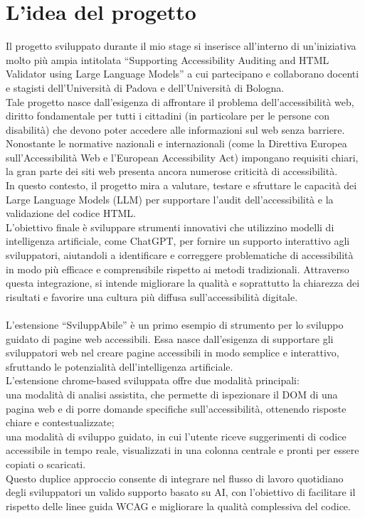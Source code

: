 \section{L'idea del progetto}
Il progetto sviluppato durante il mio stage si inserisce all’interno di un’iniziativa molto più ampia intitolata “Supporting Accessibility Auditing and HTML Validator using Large Language Models” a cui partecipano e collaborano docenti e stagisti dell’Università di Padova e dell’Università di Bologna.\\
Tale progetto nasce dall’esigenza di affrontare il problema dell’accessibilità web, diritto fondamentale per tutti i cittadini (in particolare per le persone con disabilità) che devono poter accedere alle informazioni sul web senza barriere.\\
Nonostante le normative nazionali e internazionali (come la Direttiva Europea sull’Accessibilità Web e l’European Accessibility Act) impongano requisiti chiari, la gran parte dei siti web presenta ancora numerose criticità di accessibilità.\\
In questo contesto, il progetto mira a valutare, testare e sfruttare le capacità dei Large Language Models (LLM) per supportare l’audit dell’accessibilità e la validazione del codice HTML.\\
L’obiettivo finale è sviluppare strumenti innovativi che utilizzino modelli di intelligenza artificiale, come ChatGPT, per fornire un supporto interattivo agli sviluppatori, aiutandoli a identificare e correggere problematiche di accessibilità in modo più efficace e comprensibile rispetto ai metodi tradizionali. Attraverso questa integrazione, si intende migliorare la qualità e soprattutto la chiarezza dei risultati e favorire una cultura più diffusa sull’accessibilità digitale.\\
\\
L’estensione “SviluppAbile” è un primo esempio di strumento per lo sviluppo guidato di pagine web accessibili.
Essa nasce dall’esigenza di supportare gli sviluppatori web nel creare pagine accessibili in modo semplice e interattivo, sfruttando le potenzialità dell’intelligenza artificiale.\\
L’estensione chrome-based sviluppata offre due modalità principali:\\
una modalità di analisi assistita, che permette di ispezionare il DOM di una pagina web e di porre domande specifiche sull’accessibilità, ottenendo risposte chiare e contestualizzate; \\
una modalità di sviluppo guidato, in cui l’utente riceve suggerimenti di codice accessibile in tempo reale, visualizzati in una colonna centrale e pronti per essere copiati o scaricati. \\
Questo duplice approccio consente di integrare nel flusso di lavoro quotidiano degli sviluppatori un valido supporto basato su AI, con l’obiettivo di facilitare il rispetto delle linee guida WCAG e migliorare la qualità complessiva del codice.

